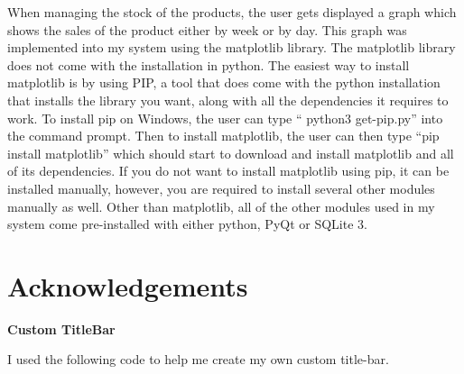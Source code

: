 When managing the stock of the products, the user gets displayed a graph which shows the sales of the product either by week or by day. This graph was implemented into my system using the matplotlib library. The matplotlib library does not come with the installation in python. The easiest way to install matplotlib is by using PIP, a tool that does come with the python installation that installs the library you want, along with all the dependencies it requires to work. To install pip on Windows, the user can type `` python3 get-pip.py'' into the command prompt. Then to install matplotlib, the user can then type ``pip install matplotlib'' which should start to download and install matplotlib and all of its dependencies. If you do not want to install matplotlib using pip, it can be installed manually, however, you are required to install several other modules manually as well. Other than matplotlib, all of the other modules used in my system come pre-installed with either python, PyQt or SQLite 3.

\section{Acknowledgements}

\textbf{Custom TitleBar}


I used the following code to help me create my own custom title-bar.

